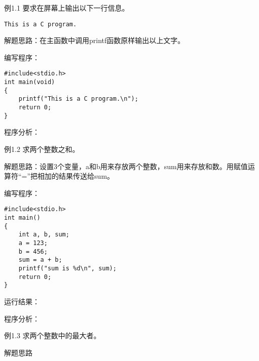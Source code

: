 例1.1 要求在屏幕上输出以下一行信息。
\begin{lstlisting}
This is a C program.
\end{lstlisting}

解题思路：在主函数中调用printf函数原样输出以上文字。

编写程序：
\begin{lstlisting}
#include<stdio.h>
int main(void)
{
	printf("This is a C program.\n");
	return 0;
}
\end{lstlisting}

程序分析：

例1.2 求两个整数之和。

解题思路：设置3个变量，a和b用来存放两个整数，sum用来存放和数。用赋值运算符“=”把相加的结果传送给sum。

编写程序：
\begin{lstlisting}
#include<stdio.h>
int main()
{
	int a, b, sum;
	a = 123;
	b = 456;
	sum = a + b;
	printf("sum is %d\n", sum);
	return 0;
}
\end{lstlisting}
运行结果：

程序分析：

例1.3 求两个整数中的最大者。

解题思路

